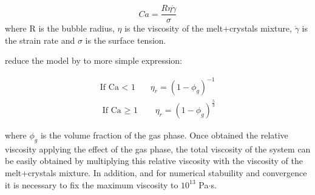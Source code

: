\begin{equation}
    Ca = \frac{R\eta\dot{\gamma}}{\sigma}
\end{equation}
 where R is the bubble radius, $\eta$ is the viscosity of the melt+crystals mixture, $\dot{\gamma}$ is the strain rate and $\sigma$ is the surface tension.

\cite{llewellin2005} reduce the model by \cite{pal2003} to more simple expression: 

\begin{equation}
    \begin{aligned}
        \text{If Ca < 1} \ \ \ \ \ \ \ \ \eta_r=(1-\phi_g)^{-1} \\
    \text{If Ca $\geq$ 1} \ \ \ \ \ \ \ \ \eta_r=(1-\phi_g)^{\frac{5}{3}}
    \end{aligned}
\end{equation}
 
where $\phi_g$ is the volume fraction of the gas phase. 
Once obtained the relative viscosity applying the effect of the gas phase, the total viscosity of the system can be easily obtained by multiplying this relative viscosity with the viscosity of the melt+crystals mixture. In addition, and for numerical stabuility and convergence it is necessary to fix the maximum viscosity to $10^{13}$ Pa$\cdot$s.




